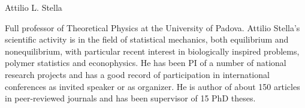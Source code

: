 \begin{participant}[type=PI,PM=8,gender=male,salary=11404.33]{Attilio L. Stella}

Full professor of Theoretical Physics at the University
of Padova. Attilio Stella's scientific activity is in the field of statistical mechanics,
both equilibrium and nonequilibrium, with particular recent interest in biologically 
inspired problems, polymer statistics and econophysics. He has been PI 
of a number of national research projects and has a good record of participation
in international conferences as invited speaker or as organizer. He is author of about
150 articles in peer-reviewed journals and has been supervisor of 15 PhD theses.

\end{participant}

